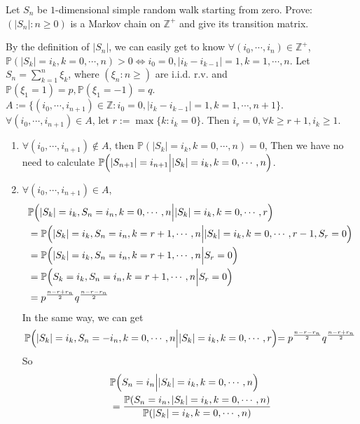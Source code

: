 \documentclass{ctexart}
\begin{document}
\begin{problem}\label{pro:4}
  Let \(S_n\) be \(1\)-dimensional simple random walk starting from zero.
  Prove: \((|S_n|: n \geq 0)\) is a Markov chain on \(\mathbb{Z}^+\) and give its transition matrix.
\end{problem}
\begin{solution}
  By the definition of \(|S_n|\), we can easily get to know
  \(\forall (i_0,\cdots,i_n) \in \mathbb{Z}^{+}\), \(\mathbb{P}(|S_k|=i_k,k=0,\cdots,n)>0 \iff i_0=0,|i_k-i_{k-1}|=1, k=1,\cdots,n\).
  Let \(S_n=\sum_{k=1}^n \xi_k\), where \((\xi_n:n \geq)\) are i.i.d. r.v. and \(\mathbb{P}(\xi_1=1)=p,\mathbb{P}(\xi_1=-1)=q\).
  \(A:=\{(i_0,\cdots,i_{n + 1}) \in \mathbb{Z}: i_0=0,|i_k-i_{k- 1}|=1,k=1,\cdots,n + 1\}\).
  \(\forall (i_0,\cdots,i_{n + 1}) \in A\), let \(r :=\max \{k:i_k=0\}\).
  Then \(i_r=0,\forall k \geq r + 1, i_k \geq 1\).
  \begin{enumerate}
    \item \(\forall (i_0,\cdots,i_{n + 1}) \notin A\), then \(\mathbb{P}(|S_k|=i_k,k=0,\cdots,n) =0\),
      Then we have no need to calculate \(\mathbb{P}\Bigl(|S_{n + 1}|=i_{n + 1} \Bigl|  |S_k|=i_k,k=0,\cdots,n\Bigl)\).
    \item \(\forall(i_0,\cdots,i_{n + 1}) \in A\),
      \[
        \begin{aligned}
           & \mathbb{P}\Bigl(|S_{k}|=i_k,S_n=i_n,k=0,\cdots,n\Bigl|  |S_k|=i_k,k=0,\cdots,r\Bigl)
          \\                        & =\mathbb{P}\Bigl(|S_{k}|=i_k,S_n=i_n,k=r + 1,\cdots,n\Bigl|  |S_k|=i_k,k=0,\cdots,r-1,S_r=0\Bigl)
          \\                        & =\mathbb{P}\Bigl(|S_{k}|=i_k,S_n=i_n,k=r +1,\cdots,n\Bigl|  S_r=0\Bigl)
          \\                        & =\mathbb{P}\Bigl(S_{k}=i_k,S_n=i_n,k=r +1,\cdots,n\Bigl|  S_r=0\Bigl)
          \\&=p^{\frac{n-r + r_n}{2}}q^{\frac{n-r -r_n}{2}}
        \end{aligned}
      \]
      In the same way, we can get
      \[
        \mathbb{P}\Bigl(|S_{k}|=i_k,S_n=-i_n,k=0,\cdots,n\Bigl|  |S_k|=i_k,k=0,\cdots,r\Bigl)=p^{\frac{n-r - r_n}{2}}q^{\frac{n-r +r_n}{2}}
      \]
      So
      \[
        \begin{aligned}
           & \mathbb{P}\Bigl(S_{n}=i_n\Bigl|  |S_k|=i_k,k=0,\cdots,n\Bigl)
          \\                                     & =          \frac{\mathbb{P}(S_{n}=i_n,|S_k|=i_k,k=0,\cdots,n)}{\mathbb{P}(|S_k|=i_k,k=0,\cdots,n)}

\end{aligned}\]
\end{enumerate}
\end{solution}
\end{document}

